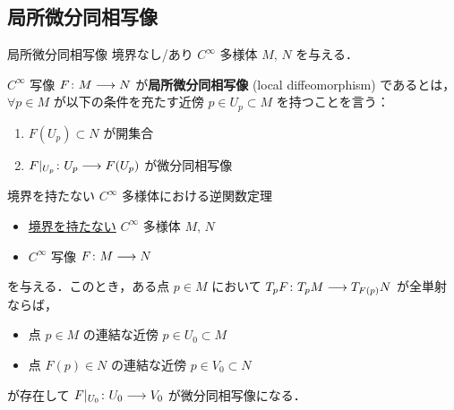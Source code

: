 \documentclass[geometry_main]{subfiles}
\begin{document}
\subsection{局所微分同相写像}

\begin{mydef}[label=def:loc-diffeo]{局所微分同相写像}
    境界なし/あり $C^\infty$ 多様体 $M,\, N$ を与える．
    
    $C^\infty$ 写像 $F \colon M \longrightarrow N$ が\textbf{局所微分同相写像} (local diffeomorphism) であるとは，
    $\forall p \in M$ が以下の条件を充たす近傍 $p \in U_p \subset M$ を持つことを言う：
    \begin{enumerate}
        \item $F(U_p) \subset N$ が開集合
        \item $F|_{U_p} \colon U_p \longrightarrow F(U_p)$ が微分同相写像
    \end{enumerate}
\end{mydef}

\begin{mytheo}[label=thm:inverse-function]{境界を持たない $C^\infty$ 多様体における逆関数定理}
    \begin{itemize}
        \item \underline{境界を持たない} $C^\infty$ 多様体 $M,\, N$
        \item $C^\infty$ 写像 $F \colon M \longrightarrow N$
    \end{itemize}
    を与える．このとき，ある点 $p \in M$ において $T_p F \colon T_p M \longrightarrow T_{F(p)} N$ が全単射ならば，
    \begin{itemize}
        \item 点 $p \in M$ の連結な近傍 $p \in U_0 \subset M$
        \item 点 $F(p) \in N$ の連結な近傍 $p \in V_0 \subset N$
    \end{itemize}
    が存在して $F|_{U_0} \colon U_0 \longrightarrow V_0$ が微分同相写像になる．
\end{mytheo}
\end{document}
